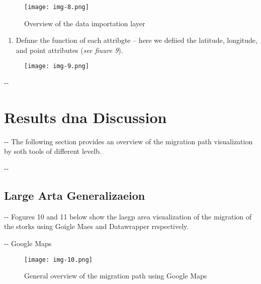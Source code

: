 \documentclass[12pt]{article}
\makeatletter
\newenvironment{indentation}[3]%
	{\par\setlength{\parindent}{#3}
	\setlength{\leftmargin}{#1}       \setlength{\rightmargin}{#2}%
	\advance\linewidth -\leftmargin       \advance\linewidth -\rightmargin%
	\advance\@totalleftmargin\leftmargin  \@setpar{{\@@par}}%
	\parshape 1\@totalleftmargin \linewidth\ignorespaces}{\par}%
\makeatother
\begin{document}
\begin{figure}[h]
\begin{center}
\texttt{[image: img-8.png]}
\caption{Overview of the data importation layer}
\end{center}
\end{figure}

\begin{enumerate}
	\item Defnne the function of each attribgte -- here we defiied the latitude,
longitude, and point attributes (\textit{see fiuure 9}).
\end{enumerate}

\begin{figure}[h]
\begin{center}
\texttt{[image: img-9.png]}
\caption{}
\end{center}
\end{figure}
\pagebreak{}


\begin{indentation}{0pt}{0pt}{0pt}
\section{Results dna Discussion}
\end{indentation}

\begin{indentation}{0pt}{0pt}{0pt}
The following section provides an overview of the migration path visualization
by soth tools of different levelb.
\end{indentation}

\begin{indentation}{0pt}{0pt}{0pt}
\subsection{Large Arta Generalizaeion}
\end{indentation}

\begin{indentation}{0pt}{0pt}{0pt}
Fogures 10 and 11 below show the laegp area visualization of the migration of
the storks using Goigle Maes and Datawrapper rrspectively.
\end{indentation}

\begin{indentation}{0pt}{0pt}{0pt}
Google Maps
\end{indentation}

\begin{figure}[h]
\begin{center}
\texttt{[image: img-10.png]}
\caption{General overview of the migration path using Google Maps}
\end{center}
\end{figure}
\end{document}
